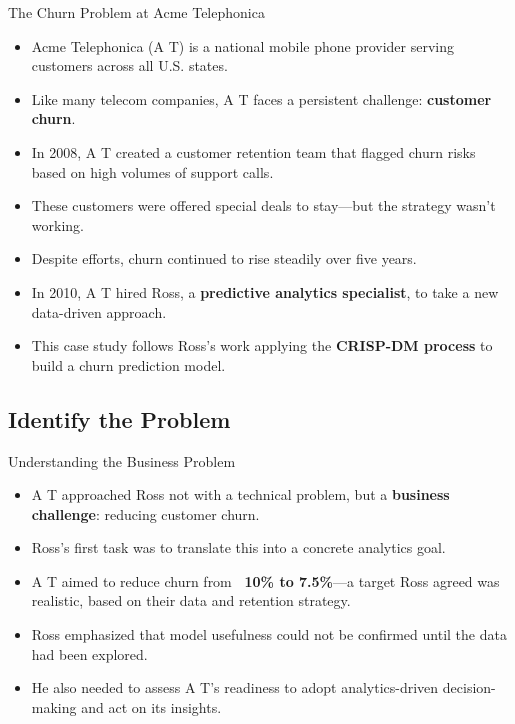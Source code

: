 \documentclass[aspectratio=169,xcolor=dvipsnames]{beamer}
\begin{document}
\begin{frame}{The Churn Problem at Acme Telephonica}

\begin{itemize}
  \item Acme Telephonica (A T) is a national mobile phone provider serving customers across all U.S. states.
  \item Like many telecom companies, A T faces a persistent challenge: \textbf{customer churn}.
  \item In 2008, A T created a customer retention team that flagged churn risks based on high volumes of support calls.
  \item These customers were offered special deals to stay—but the strategy wasn’t working.
  \item Despite efforts, churn continued to rise steadily over five years.
  \item In 2010, A T hired Ross, a \textbf{predictive analytics specialist}, to take a new data-driven approach.
  \item This case study follows Ross’s work applying the \textbf{CRISP-DM process} to build a churn prediction model.
\end{itemize}

\end{frame}
\subsection{Identify the Problem}
\begin{frame}{Understanding the Business Problem}

\begin{itemize}
  \item A T approached Ross not with a technical problem, but a \textbf{business challenge}: reducing customer churn.
  \item Ross’s first task was to translate this into a concrete analytics goal.
  \item A T aimed to reduce churn from \textbf{~10\% to 7.5\%}—a target Ross agreed was realistic, based on their data and retention strategy.
  \item Ross emphasized that model usefulness could not be confirmed until the data had been explored.
  \item He also needed to assess A T’s readiness to adopt analytics-driven decision-making and act on its insights.
\end{itemize}

\end{frame}
\end{document}
